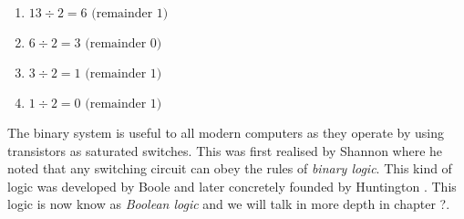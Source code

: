 \begin{enumerate}
    \item $13 \div 2 = 6\text{ (remainder 1)}$
    \item $6 \div 2 = 3\text{ (remainder 0)}$
    \item $3 \div 2 = 1\text{ (remainder 1)}$
    \item $1 \div 2 = 0\text{ (remainder 1)}$
\end{enumerate}

The binary system is useful to all modern computers as they operate by using transistors
as saturated switches. This was first realised by Shannon \cite{Shannon1937} where he
noted that any switching circuit can obey the rules of \textit{binary logic}. This kind
of logic was developed by Boole \cite{Boole1847} and later concretely founded by
Huntington \cite{Huntington1904}. This logic is now know as \textit{Boolean logic}
and we will talk in more depth in chapter ?.